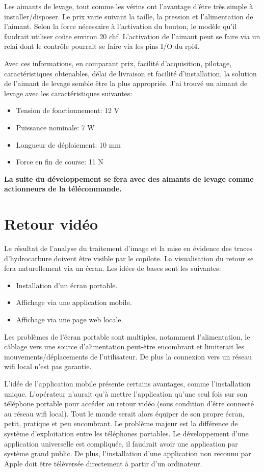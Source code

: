 Les aimants de levage, tout comme les vérins ont l'avantage d'être très simple à installer/disposer. Le prix varie suivant la taille, la pression et l'alimentation de l'aimant.
Selon la force nécessaire à l'activation du bouton, le modèle qu'il faudrait utiliser coûte environ 20 \Gls{chf}. L'activation de l'aimant peut se faire via un relai dont le contrôle
pourrait se faire via les pins I/O du \Gls{rpi4}.

Avec ces informations, en comparant prix, facilité d'acquisition, pilotage, caractéristiques obtenables, délai de livraison et facilité d'installation, la solution de l'aimant de levage semble être la plus
appropriée. J'ai trouvé un aimant de levage avec les caractéristiques suivantes:
\begin{itemize}
    \item Tension de fonctionnement: 12 \si{\volt}
    \item Puissance nominale: 7 \si{\watt}
    \item Longueur de déploiement: 10 \si{\milli\metre}
    \item Force en fin de course: 11 \si {\newton}
\end{itemize}

\textbf{La suite du développement se fera avec des aimants de levage comme actionneurs de la télécommande.}
\section{Retour vidéo}
Le résultat de l'analyse du traitement d'image et la mise en évidence des traces d'hydrocarbure doivent être visible par le copilote.
La visualisation du retour se fera naturellement via un écran. Les idées de bases sont les suivantes:
\begin{itemize}
    \item Installation d'un écran portable.
    \item Affichage via une application mobile.
    \item Affichage via une page web locale.
\end{itemize}

Les problèmes de l'écran portable sont multiples, notamment l'alimentation, le câblage vers une source d'alimentation peut-être encombrant
et limiterait les mouvements/déplacements de l'utilisateur. De plus la connexion vers un réseau \Gls{wifi} local n'est pas garantie.

L'idée de l'application mobile présente certains avantages, comme l'installation unique. L'opérateur n'aurait qu'à mettre l'application
qu'une seul fois sur son téléphone portable pour accéder au retour vidéo (sous condition d'être connecté au réseau \Gls{wifi} local).
Tout le monde serait alors équiper de son propre écran, petit, pratique et peu encombrant. Le problème majeur est la différence de système d'exploitation
entre les téléphones portables. Le développement d'une application universelle est compliquée, il faudrait avoir une application par système grand public.
De plus, l'installation d'une application non reconnu par Apple doit être téléversée directement à partir d'un ordinateur.

